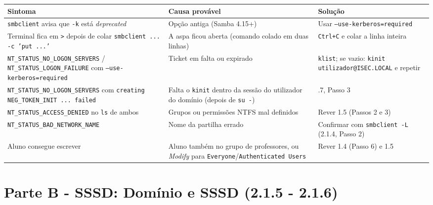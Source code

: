 \documentclass[11pt,a4paper,oneside]{report}
\begin{document}
\begin{center}\small
\begin{tabularx}{\linewidth}{|>{\raggedright\arraybackslash}X|>{\raggedright\arraybackslash}X|>{\raggedright\arraybackslash}X|}
\hline
\rowcolor{azul!10}\textbf{Sintoma} & \textbf{Causa provável} & \textbf{Solução} \\
\hline
\texttt{smbclient} avisa que \texttt{-k} está \emph{deprecated} & Opção antiga (Samba 4.15+) & Usar \texttt{--use-kerberos=required} \\
\hline
Terminal fica em \texttt{\textgreater{}} depois de colar \texttt{smbclient ... -c 'put ...'} & A aspa ficou aberta (comando colado em duas linhas) & \texttt{Ctrl+C} e colar a linha inteira \\
\hline
\texttt{NT\_STATUS\_NO\_LOGON\_SERVERS} / \texttt{NT\_STATUS\_LOGON\_FAILURE} com \texttt{--use-kerberos=required} & Ticket em falta ou expirado & \texttt{klist}; se vazio: \texttt{kinit utilizador@ISEC.LOCAL} e repetir \\
\hline
\texttt{NT\_STATUS\_NO\_LOGON\_SERVERS} com \texttt{creating NEG\_TOKEN\_INIT ... failed} & Falta o \texttt{kinit} dentro da sessão do utilizador do domínio (depois de \texttt{su -}) & 2.1.7, Passo 3 \\
\hline
\texttt{NT\_STATUS\_ACCESS\_DENIED} no \texttt{ls} de ambos & Grupos ou permissões NTFS mal definidos & Rever 1.5 (Passos 2 e 3) \\
\hline
\texttt{NT\_STATUS\_BAD\_NETWORK\_NAME} & Nome da partilha errado & Confirmar com \texttt{smbclient -L} (2.1.4, Passo 2) \\
\hline
Aluno consegue escrever & Aluno também no grupo de professores, ou \emph{Modify} para \texttt{Everyone}/\texttt{Authenticated Users} & Rever 1.4 (Passo 6) e 1.5 \\
\hline
\end{tabularx}
\end{center}

\label{ec-b1-sssd}

\section*{Parte B - SSSD: Domínio e SSSD (2.1.5 - 2.1.6)}
\end{document}

